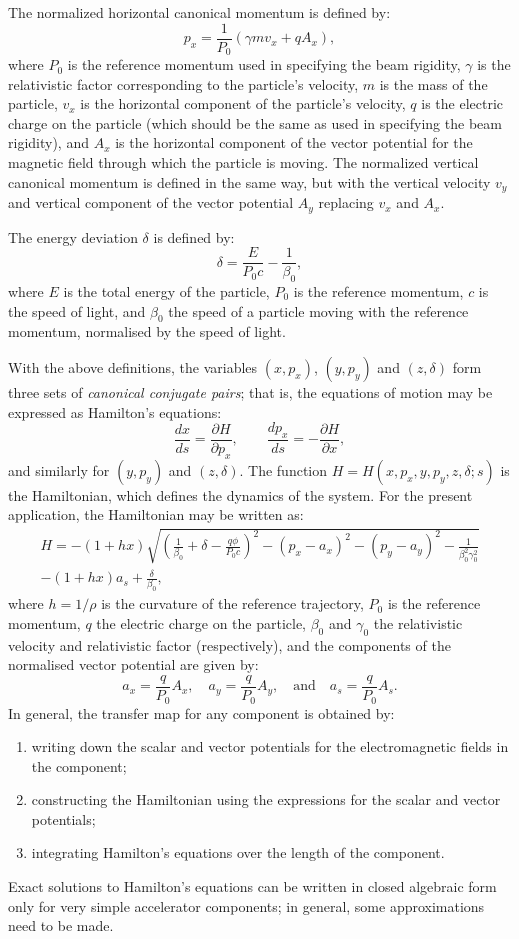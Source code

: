\documentclass[11pt,twoside,a4paper]{article}
\begin{document}
The normalized horizontal canonical momentum is defined by:
\[
p_x = \frac{1}{P_0} \left( \gamma m v_x + qA_x \right),
\]
where $P_0$ is the reference momentum used in specifying the beam rigidity,
$\gamma$ is the relativistic factor corresponding to the particle's velocity,
$m$ is the mass of the particle, $v_x$ is the horizontal component of the
particle's velocity, $q$ is the electric charge on the particle (which should
be the same as used in specifying the beam rigidity), and $A_x$ is the horizontal
component of the vector potential for the magnetic field through which the
particle is moving.  The normalized vertical canonical momentum is defined in
the same way, but with the vertical velocity $v_y$ and vertical component
of the vector potential $A_y$ replacing $v_x$ and $A_x$.

The energy deviation $\delta$ is defined by:
\[
\delta = \frac{E}{P_0 c} - \frac{1}{\beta_0},
\]
where $E$ is the total energy of the particle, $P_0$ is the reference
momentum, $c$ is the speed of light, and $\beta_0$ the speed of a particle
moving with the reference momentum, normalised by the speed of light.

With the above definitions, the variables $(x,p_x)$, $(y,p_y)$ and
$(z,\delta)$ form three sets of \emph{canonical conjugate pairs}; that is,
the equations of motion may be expressed as Hamilton's equations:
\[
\frac{dx}{ds} = \frac{\partial H}{\partial p_x}, \qquad
\frac{dp_x}{ds} = -\frac{\partial H}{\partial x},
\]
and similarly for $(y,p_y)$ and $(z,\delta)$.  The function
$H = H(x,p_x,y,p_y,z,\delta ;s)$ is the Hamiltonian, which defines
the dynamics of the system.  For the present application, the
Hamiltonian may be written as:
\begin{eqnarray}
H = -(1 + hx)\sqrt{\left( \frac{1}{\beta_0} + \delta - \frac{q\phi}{P_0c} \right)^2 - (p_x - a_x)^2 - (p_y - a_y)^2 - \frac{1}{\beta_0^2 \gamma_0^2}} \nonumber \\
 - (1 + hx)a_s + \frac{\delta}{\beta_0}, \nonumber
\end{eqnarray}
where $h=1/\rho$ is the curvature of the reference trajectory, $P_0$ is
the reference momentum, $q$ the electric charge on the particle, $\beta_0$
and $\gamma_0$ the relativistic velocity and relativistic factor (respectively),
and the components of the normalised vector potential are given by:
\[
a_x = \frac{q}{P_0}A_x, \quad a_y = \frac{q}{P_0}A_y, \quad \textrm{and} \quad
a_s = \frac{q}{P_0}A_s.
\]
In general, the transfer map for any component is obtained by:
\begin{enumerate}
\item writing down the scalar and vector potentials for the electromagnetic
fields in the component;
\item constructing the Hamiltonian using the expressions for the scalar
and vector potentials;
\item integrating Hamilton's equations over the length of the component.
\end{enumerate}
Exact solutions to Hamilton's equations can be written in closed algebraic
form only for very simple accelerator components; in general, some
approximations need to be made.
\end{document}
